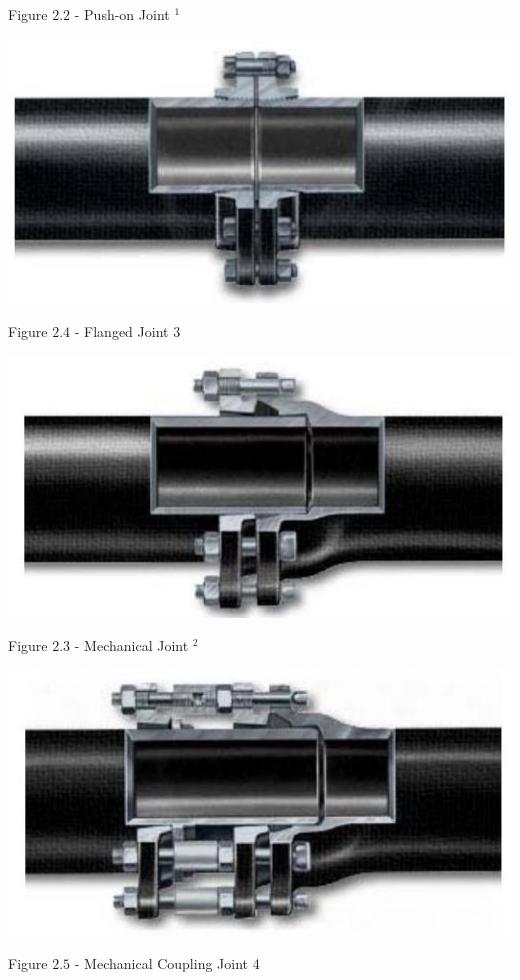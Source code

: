 \documentclass[10pt]{article}
\begin{document}
Figure $2.2$ - Push-on Joint ${ }^{1}$

\includegraphics[max width=\textwidth]{FlangedJoint}

Figure $2.4$ - Flanged Joint 3

\includegraphics[max width=\textwidth]{MechanicalJoint}

Figure $2.3$ - Mechanical Joint ${ }^{2}$

\includegraphics[max width=\textwidth]{MechanicalCouplingJoint}

Figure $2.5$ - Mechanical Coupling Joint 4
\end{document}
